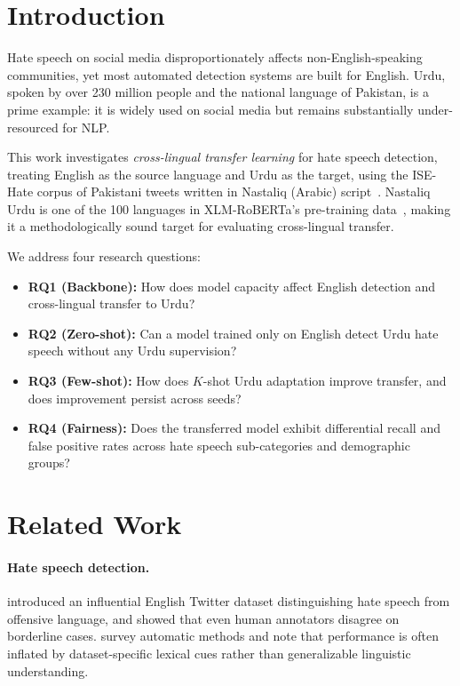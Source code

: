 \documentclass{article}
\begin{document}
\section{Introduction}
\label{sec:intro}

Hate speech on social media disproportionately affects non-English-speaking
communities, yet most automated detection systems are built for English.
Urdu, spoken by over 230 million people and the national language of Pakistan,
is a prime example: it is widely used on social media but remains
substantially under-resourced for NLP.

This work investigates \textit{cross-lingual transfer learning} for hate
speech detection, treating English as the source language and Urdu as the
target, using the ISE-Hate corpus of Pakistani tweets written in Nastaliq
(Arabic) script~\citep{akram2023ise}.
Nastaliq Urdu is one of the 100 languages in XLM-RoBERTa's pre-training
data~\citep{conneau2020unsupervised}, making it a methodologically sound
target for evaluating cross-lingual transfer.

We address four research questions:

\begin{itemize}[leftmargin=*,nosep]
  \item \textbf{RQ1 (Backbone):} How does model capacity affect English
        detection and cross-lingual transfer to Urdu?
  \item \textbf{RQ2 (Zero-shot):} Can a model trained only on English detect
        Urdu hate speech without any Urdu supervision?
  \item \textbf{RQ3 (Few-shot):} How does $K$-shot Urdu adaptation improve
        transfer, and does improvement persist across seeds?
  \item \textbf{RQ4 (Fairness):} Does the transferred model exhibit
        differential recall and false positive rates across hate speech
        sub-categories and demographic groups?
\end{itemize}

\section{Related Work}
\label{sec:related}

\paragraph{Hate speech detection.}
\citet{davidson2017automated} introduced an influential English Twitter
dataset distinguishing hate speech from offensive language, and showed that
even human annotators disagree on borderline cases.
\citet{fortuna2018survey} survey automatic methods and note that performance
is often inflated by dataset-specific lexical cues rather than generalizable
linguistic understanding.
\end{document}
